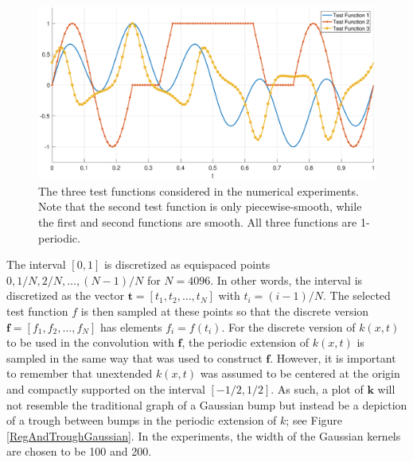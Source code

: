\documentclass[12pt]{article}
\newcommand{\kcon}{k}
\newcommand{\fcon}{f}
\newcommand{\kdis}{\mathbf{k}}
\newcommand{\fdis}{\mathbf{f}}
\newcommand{\tdis}{\mathbf{t}}
\begin{document}
\begin{figure}
	\centerline{\includegraphics[scale = 0.45]{Figures/TestFunctions1D.eps}}
\caption{The three test functions considered in the numerical experiments. Note that the second test function is only piecewise-smooth, while the first and second functions are smooth. All three functions are 1-periodic.}
\label{TestFunctions}
\end{figure}

The interval $[0,1]$ is discretized as equispaced points $0, 1/N, 2/N, \ldots, (N-1)/N$ for $N = 4096$. In other words, the interval is discretized as the vector $\tdis = [t_1,t_2,\ldots,t_N]$ with $t_i = (i-1)/N$. The selected test function $\fcon$ is then sampled at these points so that the discrete version $\fdis = [\fcon_1,\fcon_2,\ldots,\fcon_N]$ has elements $\fcon_i = \fcon(t_i)$. For the discrete version of $\kcon(x,t)$ to be used in the convolution with $\fdis$, the periodic extension of $\kcon(x,t)$ is sampled in the same way that was used to construct $\fdis$. However, it is important to remember that unextended $\kcon(x,t)$ was assumed to be centered at the origin and compactly supported on the interval $[-1/2,1/2]$. As such, a plot of $\kdis$ will not resemble the traditional graph of a Gaussian bump but instead be a depiction of a trough between bumps in the periodic extension of $\kcon$; see Figure \ref{RegAndTroughGaussian}. In the experiments, the width of the Gaussian kernels are chosen to be 100 and 200.  \par
\end{document}
